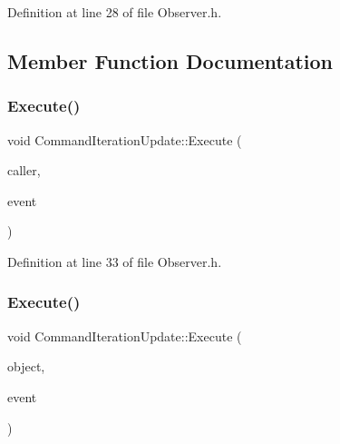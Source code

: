 Definition at line 28 of file Observer.\+h.



\subsection{Member Function Documentation}
\mbox{\label{class_command_iteration_update_a9283ff36a470e597ea27e73a557d7c5f}} 
\subsubsection{\texorpdfstring{Execute()}{Execute()}\hspace{0.1cm}{\footnotesize\ttfamily [1/2]}}
{\footnotesize\ttfamily void Command\+Iteration\+Update\+::\+Execute (\begin{DoxyParamCaption}\item[{itk\+::\+Object $\ast$}]{caller,  }\item[{const itk\+::\+Event\+Object \&}]{event }\end{DoxyParamCaption})\hspace{0.3cm}{\ttfamily [inline]}}



Definition at line 33 of file Observer.\+h.

\mbox{\label{class_command_iteration_update_acb3a3b59afa764cf1b6d73190c33e6cb}} 
\subsubsection{\texorpdfstring{Execute()}{Execute()}\hspace{0.1cm}{\footnotesize\ttfamily [2/2]}}
{\footnotesize\ttfamily void Command\+Iteration\+Update\+::\+Execute (\begin{DoxyParamCaption}\item[{const itk\+::\+Object $\ast$}]{object,  }\item[{const itk\+::\+Event\+Object \&}]{event }\end{DoxyParamCaption})\hspace{0.3cm}{\ttfamily [inline]}}



